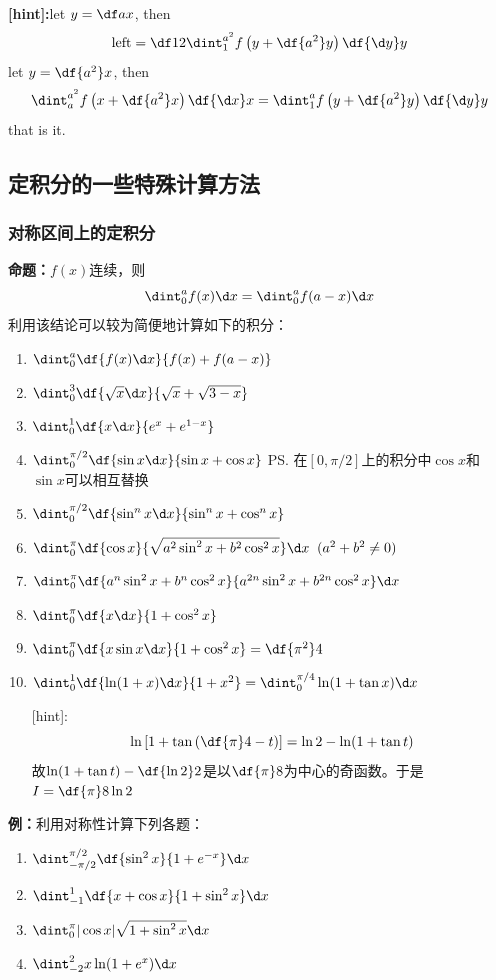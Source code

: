 {\bf [hint]:}let $y=\df ax$, then
$$\mbox{left}=\df12\dint_1^{a^2}f\left(y+\df{a^2}y\right)\df{\d y}y$$
let $y=\df{a^2}x$, then
$$\dint_a^{a^2}f\left(x+\df{a^2}x\right)\df{\d x}x
=\dint_1^af\left(y+\df{a^2}y\right)\df{\d y}y$$
that is it.

\subsection{定积分的一些特殊计算方法}

\subsubsection{对称区间上的定积分}

{\bf 命题：}$f(x)$连续，则
$$\dint_0^af(x)\d x=\dint_0^af(a-x)\d x$$
利用该结论可以较为简便地计算如下的积分：
\begin{enumerate}[(1)]
  \setlength{\itemindent}{1cm}
  \item $\dint_0^a\df{f(x)\d x}{f(x)+f(a-x)}$
  \item $\dint_0^3\df{\sqrt x\d x}{\sqrt x+\sqrt{3-x}}$
  \item $\dint_0^1\df{x\d x}{e^x+e^{1-x}}$
  \item $\dint_0^{\pi/2}\df{\sin x\d x}{\sin x+\cos x}$
  \ps{在$[0,\pi/2]$上的积分中$\cos x$和$\sin x$可以相互替换}
  \item $\dint_0^{\pi/2}\df{\sin^nx\d x}{\sin^nx+\cos^nx}$
  \item $\dint_0^{\pi}\df{\cos x}{\sqrt{a^2\sin^2x+b^2\cos^2x}}\d
  x\;\;(a^2+b^2\ne 0)$
  \item $\dint_0^{\pi}\df{a^n\sin^2x+b^n\cos^2x}
  {a^{2n}\sin^2x+b^{2n}\cos^2x}\d x$
  \item $\dint_0^{\pi}\df{x\d x}{1+\cos^2x}$
  \item $\dint_0^{\pi}\df{x\sin x\d x}{1+\cos^2x}=\df{\pi^2}4$
  \item $\dint_0^1\df{\ln(1+x)\d x}{1+x^2}=\dint_0^{\pi/4}\ln(1+\tan x)\d x$
  
  [hint]:
  $$\ln\left[1+\tan\left(\df{\pi}4-t\right)\right]=\ln2-\ln(1+\tan t)$$
  故$\ln(1+\tan t)-\df{\ln2}2$是以$\df{\pi}8$为中心的奇函数。于是$I=\df{\pi}8\ln2$
\end{enumerate}

{\bf 例：}利用对称性计算下列各题：
\begin{enumerate}[(1)]
  \setlength{\itemindent}{1cm}
  \item $\dint_{-\pi/2}^{\pi/2}\df{\sin^2x}{1+e^{-x}}\d x$
  \item $\dint_{-1}^1\df{x+\cos x}{1+\sin^2x}\d x$
  \item $\dint_{0}^{\pi}|\cos x|\sqrt{1+\sin^2x}\d x$
  \item $\dint_{-2}^2x\ln(1+e^x)\d x$
\end{enumerate}

